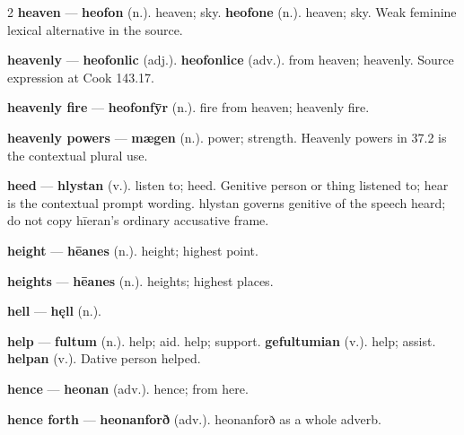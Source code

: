 \begin{multicols}{2}
\textbf{heaven} — \textbf{heofon} (n.). heaven; sky. \textbf{heofone} (n.). heaven; sky. Weak feminine lexical alternative in the source.\par
\textbf{heavenly} — \textbf{heofonlic} (adj.).  \textbf{heofonlice} (adv.). from heaven; heavenly. Source expression at Cook 143.17.\par
\textbf{heavenly fire} — \textbf{heofonfȳr} (n.). fire from heaven; heavenly fire.\par
\textbf{heavenly powers} — \textbf{mægen} (n.). power; strength. Heavenly powers in 37.2 is the contextual plural use.\par
\textbf{heed} — \textbf{hlystan} (v.). listen to; heed. Genitive person or thing listened to; hear is the contextual prompt wording. hlystan governs genitive of the speech heard; do not copy hīeran's ordinary accusative frame.\par
\textbf{height} — \textbf{hēanes} (n.). height; highest point.\par
\textbf{heights} — \textbf{hēanes} (n.). heights; highest places.\par
\textbf{hell} — \textbf{hęll} (n.).\par
\textbf{help} — \textbf{fultum} (n.). help; aid. help; support. \textbf{gefultumian} (v.). help; assist. \textbf{helpan} (v.). Dative person helped.\par
\textbf{hence} — \textbf{heonan} (adv.). hence; from here.\par
\textbf{hence forth} — \textbf{heonanforð} (adv.). heonanforð as a whole adverb.\par

\end{multicols}
